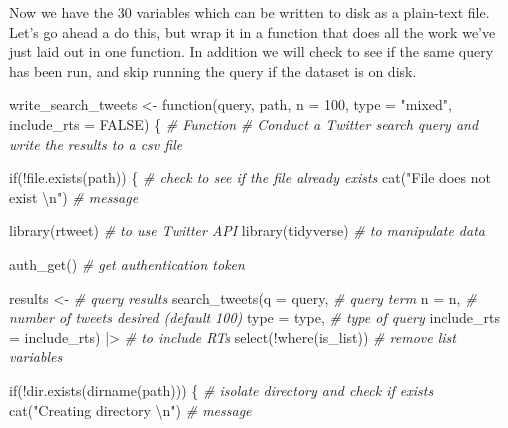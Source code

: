 \documentclass[
  letterpaper,
]{latex/krantz}
\newenvironment{Shaded}{\begin{snugshade}}{\end{snugshade}}
\newcommand{\AttributeTok}[1]{\textcolor[rgb]{0.00,0.00,0.00}{#1}}
\newcommand{\CommentTok}[1]{\textcolor[rgb]{0.00,0.00,0.00}{\textit{#1}}}
\newcommand{\ConstantTok}[1]{\textcolor[rgb]{0.00,0.00,0.00}{#1}}
\newcommand{\ControlFlowTok}[1]{\textcolor[rgb]{0.00,0.00,0.00}{#1}}
\newcommand{\DecValTok}[1]{\textcolor[rgb]{0.00,0.00,0.00}{#1}}
\newcommand{\FunctionTok}[1]{\textcolor[rgb]{0.00,0.00,0.00}{#1}}
\newcommand{\NormalTok}[1]{\textcolor[rgb]{0.00,0.00,0.00}{#1}}
\newcommand{\OtherTok}[1]{\textcolor[rgb]{0.00,0.00,0.00}{#1}}
\newcommand{\SpecialCharTok}[1]{\textcolor[rgb]{0.00,0.00,0.00}{#1}}
\newcommand{\StringTok}[1]{\textcolor[rgb]{0.00,0.00,0.00}{#1}}
\begin{document}
Now we have the 30 variables which can be written to disk as a
plain-text file. Let's go ahead a do this, but wrap it in a function
that does all the work we've just laid out in one function. In addition
we will check to see if the same query has been run, and skip running
the query if the dataset is on disk.

\begin{Shaded}
\begin{Highlighting}[]
\NormalTok{write\_search\_tweets }\OtherTok{\textless{}{-}} 
  \ControlFlowTok{function}\NormalTok{(query, path, }\AttributeTok{n =} \DecValTok{100}\NormalTok{, }\AttributeTok{type =} \StringTok{"mixed"}\NormalTok{, }\AttributeTok{include\_rts =} \ConstantTok{FALSE}\NormalTok{) \{}
    \CommentTok{\# Function}
    \CommentTok{\# Conduct a Twitter search query and write the results to a csv file}
    
    \ControlFlowTok{if}\NormalTok{(}\SpecialCharTok{!}\FunctionTok{file.exists}\NormalTok{(path)) \{ }\CommentTok{\# check to see if the file already exists}
      \FunctionTok{cat}\NormalTok{(}\StringTok{"File does not exist }\SpecialCharTok{\textbackslash{}n}\StringTok{"}\NormalTok{) }\CommentTok{\# message}
      
      \FunctionTok{library}\NormalTok{(rtweet) }\CommentTok{\# to use Twitter API}
      \FunctionTok{library}\NormalTok{(tidyverse) }\CommentTok{\# to manipulate data}
      
      \FunctionTok{auth\_get}\NormalTok{() }\CommentTok{\# get authentication token}
      
\NormalTok{      results }\OtherTok{\textless{}{-}} \CommentTok{\# query results}
        \FunctionTok{search\_tweets}\NormalTok{(}\AttributeTok{q =}\NormalTok{ query, }\CommentTok{\# query term}
                      \AttributeTok{n =}\NormalTok{ n, }\CommentTok{\# number of tweets desired (default 100)}
                      \AttributeTok{type =}\NormalTok{ type, }\CommentTok{\# type of query}
                      \AttributeTok{include\_rts =}\NormalTok{ include\_rts) }\SpecialCharTok{|\textgreater{}}  \CommentTok{\# to include RTs}
        \FunctionTok{select}\NormalTok{(}\SpecialCharTok{!}\FunctionTok{where}\NormalTok{(is\_list))  }\CommentTok{\# remove list variables}
      
      \ControlFlowTok{if}\NormalTok{(}\SpecialCharTok{!}\FunctionTok{dir.exists}\NormalTok{(}\FunctionTok{dirname}\NormalTok{(path))) \{ }\CommentTok{\# isolate directory and check if exists}
        \FunctionTok{cat}\NormalTok{(}\StringTok{"Creating directory }\SpecialCharTok{\textbackslash{}n}\StringTok{"}\NormalTok{) }\CommentTok{\# message}
        

\end{Highlighting}
\end{Shaded}
\end{document}
